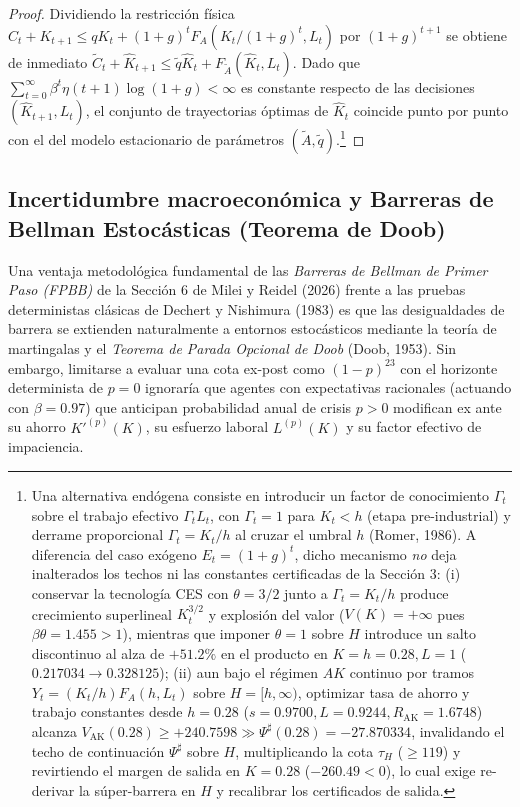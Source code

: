 \documentclass[11pt,letterpaper]{article}
\theoremstyle{plain}
\begin{document}
\begin{proof}
Dividiendo la restricción física $C_t+K_{t+1}\le qK_t+(1+g)^t F_A(K_t/(1+g)^t, L_t)$ por $(1+g)^{t+1}$ se obtiene de inmediato $\tilde{C}_t+\hat{K}_{t+1}\le \tilde{q}\hat{K}_t+F_{\tilde{A}}(\hat{K}_t,L_t)$. Dado que $\sum_{t=0}^\infty \beta^t\eta(t+1)\log(1+g)<\infty$ es constante respecto de las decisiones $(\hat{K}_{t+1},L_t)$, el conjunto de trayectorias óptimas de $\hat{K}_t$ coincide punto por punto con el del modelo estacionario de parámetros $(\tilde{A},\tilde{q})$.\footnote{Una alternativa endógena consiste en introducir un factor de conocimiento $\Gamma_t$ sobre el trabajo efectivo $\Gamma_t L_t$, con $\Gamma_t=1$ para $K_t<h$ (etapa pre-industrial) y derrame proporcional $\Gamma_t=K_t/h$ al cruzar el umbral $h$ (Romer, 1986). A diferencia del caso exógeno $E_t=(1+g)^t$, dicho mecanismo \emph{no} deja inalterados los techos ni las constantes certificadas de la Sección 3: (i) conservar la tecnología CES con $\theta=3/2$ junto a $\Gamma_t=K_t/h$ produce crecimiento superlineal $K_t^{3/2}$ y explosión del valor ($V(K)=+\infty$ pues $\beta\theta=1.455>1$), mientras que imponer $\theta=1$ sobre $H$ introduce un salto discontinuo al alza de $+51.2\%$ en el producto en $K=h=0.28, L=1$ ($0.217034\to 0.328125$); (ii) aun bajo el régimen $AK$ continuo por tramos $Y_t=(K_t/h)F_A(h,L_t)$ sobre $H=[h,\infty)$, optimizar tasa de ahorro y trabajo constantes desde $h=0.28$ ($s=0.9700, L=0.9244, R_{\mathrm{AK}}=1.6748$) alcanza $V_{\mathrm{AK}}(0.28)\ge +240.7598 \gg \Psi^\sharp(0.28)=-27.870334$, invalidando el techo de continuación $\Psi^\sharp$ sobre $H$, multiplicando la cota $\tau_H$ ($\ge 119$) y revirtiendo el margen de salida en $K=0.28$ ($-260.49<0$), lo cual exige re-derivar la súper-barrera en $H$ y recalibrar los certificados de salida.}
\end{proof}

\subsection{Incertidumbre macroeconómica y Barreras de Bellman Estocásticas (Teorema de Doob)}

Una ventaja metodológica fundamental de las \emph{Barreras de Bellman de Primer Paso (FPBB)} de la Sección 6 de Milei y Reidel (2026) frente a las pruebas deterministas clásicas de Dechert y Nishimura (1983) es que las desigualdades de barrera se extienden naturalmente a entornos estocásticos mediante la teoría de martingalas y el \emph{Teorema de Parada Opcional de Doob} (Doob, 1953). Sin embargo, limitarse a evaluar una cota ex-post como $(1-p)^{23}$ con el horizonte determinista de $p=0$ ignoraría que agentes con expectativas racionales (actuando con $\beta=0.97$) que anticipan probabilidad anual de crisis $p>0$ modifican ex ante su ahorro $K'^{(p)}(K)$, su esfuerzo laboral $L^{(p)}(K)$ y su factor efectivo de impaciencia.
\end{document}
